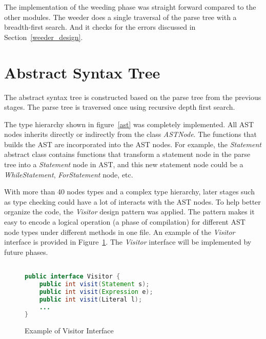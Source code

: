 The implementation of the weeding phase was straight forward compared to the other modules. The weeder does a single traversal of the parse tree with a breadth-first search. And it checks for the errors discussed in Section~\ref{weeder_design}. 

\section{Abstract Syntax Tree }
The abstract syntax tree is constructed based on the parse tree from the previous stages. The parse tree is traversed once using recursive depth first search. 

The type hierarchy shown in figure~\ref{ast} was completely implemented. All AST nodes inherits directly or indirectly from the class \emph{ASTNode}. The functions that builds the AST are incorporated into the AST nodes. For example, the \emph{Statement} abstract class contains functions that transform a statement node in the parse tree into a \emph{Statement} node in AST, and this new statement node could be a \emph{WhileStatement}, \emph{ForStatement} node, etc.

With more than 40 nodes types and a complex type hierarchy, later stages such as type checking could have a lot of interacts with the AST nodes. To help better organize the code, the \emph{Visitor} design pattern was applied. The pattern makes it easy to encode a logical operation (a phase of compilation) for different AST node types under different methods in one file. An example of the \emph{Visitor} interface is provided in Figure~\ref{visitor}. The \emph{Visitor} interface will be implemented by future phases.

\begin{figure}

\begin{lstlisting}[language=Java, frame=single]  % Start your code-block

public interface Visitor {
	public int visit(Statement s);
	public int visit(Expression e);
	public int visit(Literal l);
	...
}
\end{lstlisting}
\caption{Example of Visitor Interface}
\label{visitor}
\end{figure}

